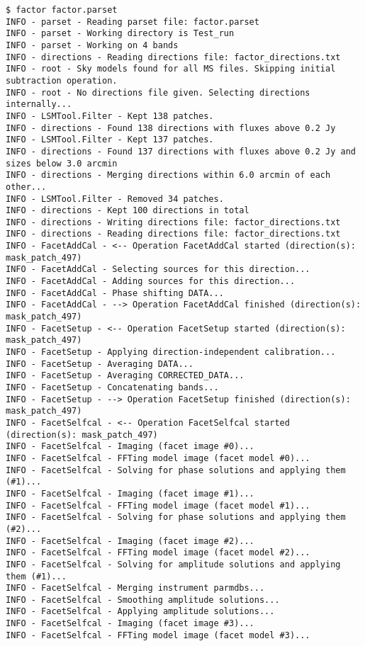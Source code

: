 \documentclass[structabstract]{article}
\begin{document}
{\begin{enumerate}
\begin{verbatim}
$ factor factor.parset
INFO - parset - Reading parset file: factor.parset
INFO - parset - Working directory is Test_run
INFO - parset - Working on 4 bands
INFO - directions - Reading directions file: factor_directions.txt
INFO - root - Sky models found for all MS files. Skipping initial subtraction operation.
INFO - root - No directions file given. Selecting directions internally...
INFO - LSMTool.Filter - Kept 138 patches.
INFO - directions - Found 138 directions with fluxes above 0.2 Jy
INFO - LSMTool.Filter - Kept 137 patches.
INFO - directions - Found 137 directions with fluxes above 0.2 Jy and sizes below 3.0 arcmin
INFO - directions - Merging directions within 6.0 arcmin of each other...
INFO - LSMTool.Filter - Removed 34 patches.
INFO - directions - Kept 100 directions in total
INFO - directions - Writing directions file: factor_directions.txt
INFO - directions - Reading directions file: factor_directions.txt
INFO - FacetAddCal - <-- Operation FacetAddCal started (direction(s): mask_patch_497)
INFO - FacetAddCal - Selecting sources for this direction...
INFO - FacetAddCal - Adding sources for this direction...
INFO - FacetAddCal - Phase shifting DATA...
INFO - FacetAddCal - --> Operation FacetAddCal finished (direction(s): mask_patch_497)
INFO - FacetSetup - <-- Operation FacetSetup started (direction(s): mask_patch_497)
INFO - FacetSetup - Applying direction-independent calibration...
INFO - FacetSetup - Averaging DATA...
INFO - FacetSetup - Averaging CORRECTED_DATA...
INFO - FacetSetup - Concatenating bands...
INFO - FacetSetup - --> Operation FacetSetup finished (direction(s): mask_patch_497)
INFO - FacetSelfcal - <-- Operation FacetSelfcal started (direction(s): mask_patch_497)
INFO - FacetSelfcal - Imaging (facet image #0)...
INFO - FacetSelfcal - FFTing model image (facet model #0)...
INFO - FacetSelfcal - Solving for phase solutions and applying them (#1)...
INFO - FacetSelfcal - Imaging (facet image #1)...
INFO - FacetSelfcal - FFTing model image (facet model #1)...
INFO - FacetSelfcal - Solving for phase solutions and applying them (#2)...
INFO - FacetSelfcal - Imaging (facet image #2)...
INFO - FacetSelfcal - FFTing model image (facet model #2)...
INFO - FacetSelfcal - Solving for amplitude solutions and applying them (#1)...
INFO - FacetSelfcal - Merging instrument parmdbs...
INFO - FacetSelfcal - Smoothing amplitude solutions...
INFO - FacetSelfcal - Applying amplitude solutions...
INFO - FacetSelfcal - Imaging (facet image #3)...
INFO - FacetSelfcal - FFTing model image (facet model #3)...

\end{verbatim}
\end{enumerate}}
\end{document}
